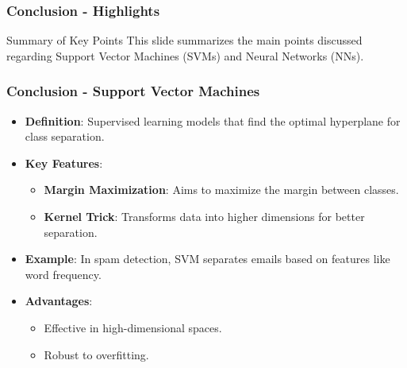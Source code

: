 \documentclass[aspectratio=169]{beamer}
\begin{document}
\begin{frame}[fragile]
    \frametitle{Conclusion - Highlights}
    \begin{block}{Summary of Key Points}
        This slide summarizes the main points discussed regarding Support Vector Machines (SVMs) and Neural Networks (NNs).
    \end{block}
\end{frame}

\begin{frame}[fragile]
    \frametitle{Conclusion - Support Vector Machines}
    \begin{itemize}
        \item \textbf{Definition}: Supervised learning models that find the optimal hyperplane for class separation.
        \item \textbf{Key Features}:
            \begin{itemize}
                \item \textbf{Margin Maximization}: Aims to maximize the margin between classes.
                \item \textbf{Kernel Trick}: Transforms data into higher dimensions for better separation.
            \end{itemize}
        \item \textbf{Example}: In spam detection, SVM separates emails based on features like word frequency.
        \item \textbf{Advantages}:
            \begin{itemize}
                \item Effective in high-dimensional spaces.
                \item Robust to overfitting.
            \end{itemize}
    \end{itemize}
\end{frame}
\end{document}
